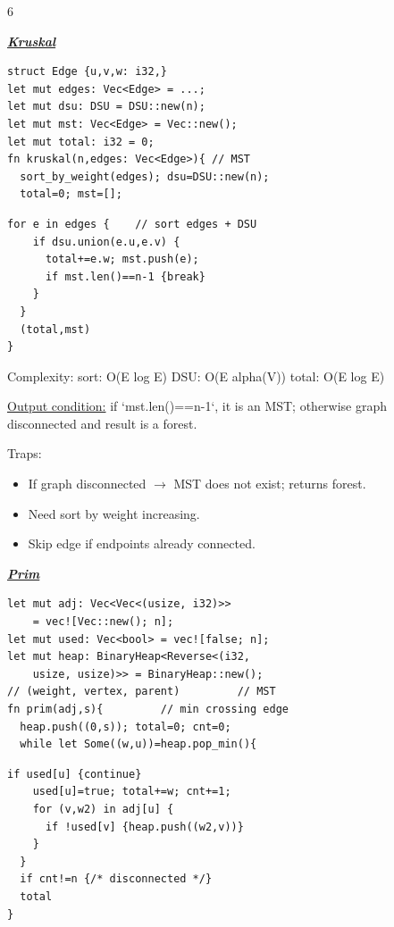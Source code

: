 \documentclass[a4paper,landscape]{article}
\renewcommand{\textbf}[1]{\underline{#1}}
\newcommand{\subsectionsize}{\fontsize{3.92}{4.02}\selectfont}
\newcommand{\subsectiontitle}[1]{%
  \par\vspace{0pt}%
  {\subsectionsize\bfseries\itshape\textbf{#1}}\par%
  \vspace{0pt}%
}
\begin{document}
\begin{multicols*}{6}
\subsectiontitle{Kruskal}
\begin{minipage}[t]{0.49\linewidth}\vspace{0pt}
\begin{lstlisting}[aboveskip=0pt,belowskip=0pt]
struct Edge {u,v,w: i32,}
let mut edges: Vec<Edge> = ...;
let mut dsu: DSU = DSU::new(n);
let mut mst: Vec<Edge> = Vec::new();
let mut total: i32 = 0;
fn kruskal(n,edges: Vec<Edge>){ // MST
  sort_by_weight(edges); dsu=DSU::new(n); 
  total=0; mst=[];
\end{lstlisting}
\end{minipage}\hfill
\begin{minipage}[t]{0.49\linewidth}\vspace{0pt}
\begin{lstlisting}[aboveskip=0pt,belowskip=0pt]
  for e in edges {    // sort edges + DSU
    if dsu.union(e.u,e.v) {
      total+=e.w; mst.push(e);
      if mst.len()==n-1 {break}
    }
  }
  (total,mst)
}
\end{lstlisting}
\end{minipage}
Complexity:
sort: O(E log E)
DSU: O(E alpha(V))
total: O(E log E)

 \textbf{Output condition:} if `mst.len()==n-1`, it is an MST; otherwise graph disconnected and result is a forest.

Traps:

\begin{itemize}
  \item If graph disconnected $\to$ MST does not exist; returns forest.
  \item Need sort by weight increasing.
  \item Skip edge if endpoints already connected.
\end{itemize}

\subsectiontitle{Prim}

\begin{minipage}[t]{0.32\linewidth}\vspace{0pt}
\begin{lstlisting}[aboveskip=0pt,belowskip=0pt]
let mut adj: Vec<Vec<(usize, i32)>> 
    = vec![Vec::new(); n];
let mut used: Vec<bool> = vec![false; n];
let mut heap: BinaryHeap<Reverse<(i32, 
    usize, usize)>> = BinaryHeap::new();
// (weight, vertex, parent)         // MST
fn prim(adj,s){         // min crossing edge
  heap.push((0,s)); total=0; cnt=0;
  while let Some((w,u))=heap.pop_min(){
\end{lstlisting}
\end{minipage}\hfill
\begin{minipage}[t]{0.52\linewidth}\vspace{0pt}
\begin{lstlisting}[aboveskip=0pt,belowskip=0pt]
    if used[u] {continue}
    used[u]=true; total+=w; cnt+=1;
    for (v,w2) in adj[u] {
      if !used[v] {heap.push((w2,v))}
    }
  }
  if cnt!=n {/* disconnected */}
  total
}
\end{lstlisting}
\end{minipage}


\end{multicols*}
\end{document}

